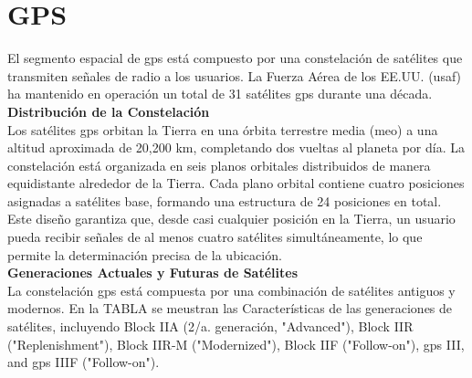 \section{GPS}

\renewcommand{\thetable}{2}

\begin{justify}
    El segmento espacial de \gls{gps} está compuesto por una constelación de satélites que transmiten señales de radio a los usuarios.
    La Fuerza Aérea de los EE.UU. (\gls{usaf}) ha mantenido en operación un total de 31 satélites \gls{gps} durante una década.\\

    \noindent\textbf{Distribución de la Constelación}\\
    Los satélites \gls{gps} orbitan la Tierra en una órbita terrestre media (\gls{meo}) a una altitud aproximada de 20,200 km, completando
    dos vueltas al planeta por día. La constelación está organizada en seis planos orbitales distribuidos de manera equidistante alrededor
    de la Tierra. Cada plano orbital contiene cuatro posiciones asignadas a satélites base, formando una estructura de 24 posiciones en total.
    Este diseño garantiza que, desde casi cualquier posición en la Tierra, un usuario pueda recibir señales de al menos cuatro satélites simultáneamente,
    lo que permite la determinación precisa de la ubicación.\\

    \noindent\textbf{Generaciones Actuales y Futuras de Satélites}\\
    La constelación \gls{gps} está compuesta por una combinación de satélites antiguos y modernos. En la TABLA se meustran las Características de las
    generaciones de satélites, incluyendo Block IIA (2/a. generación, "Advanced"), Block IIR ("Replenishment"), Block IIR-M ("Modernized"), Block IIF ("Follow-on"),
    \gls{gps} III, and \gls{gps} IIIF ("Follow-on").
\end{justify}

